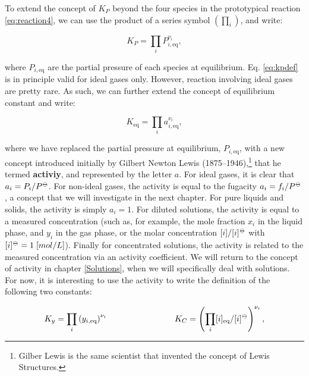 \documentclass[
  9pt,
]{extbook}
\theoremstyle{definition}
\theoremstyle{definition}
\theoremstyle{definition}
\theoremstyle{remark}
\begin{document}
To extend the concept of \(K_P\) beyond the four species in the prototypical reaction \eqref{eq:reaction4}, we can use the product of a series symbol \(\left( \prod_i \right)\), and write:

\begin{equation}
K_P=\prod_i P_{i,\text{eq}}^{\nu_i},
\label{eq:kpdef}
\end{equation}

where \(P_{i,\text{eq}}\) are the partial pressure of each species at equilibrium. Eq. \eqref{eq:kpdef} is in principle valid for ideal gases only. However, reaction involving ideal gases are pretty rare. As such, we can further extend the concept of equilibrium constant and write:

\begin{equation}
K_{\text{eq}} =\prod_i a_{i,\text{eq}}^{\nu_i},
\label{eq:kdef}
\end{equation}

where we have replaced the partial pressure at equilibrium, \(P_{i,\text{eq}}\), with a new concept introduced initially by Gilbert Newton Lewis (1875--1946),\footnote{Gilber Lewis is the same scientist that invented the concept of Lewis Structures.} that he termed \textbf{activiy}, and represented by the letter \(a\). For ideal gases, it is clear that \(a_i=P_i/P^{-\kern-6pt{\ominus}\kern-6pt-}\). For non-ideal gases, the activity is equal to the fugacity \(a_i=f_i/P^{-\kern-6pt{\ominus}\kern-6pt-}\), a concept that we will investigate in the next chapter. For pure liquids and solids, the activity is simply \(a_i=1\). For diluted solutions, the activity is equal to a measured concentration (such as, for example, the mole fraction \(x_i\) in the liquid phase, and \(y_i\) in the gas phase, or the molar concentration \([i]/[i]^{-\kern-6pt{\ominus}\kern-6pt-}\) with \([i]^{-\kern-6pt{\ominus}\kern-6pt-}= 1\;\text[mol/L]\)). Finally for concentrated solutions, the activity is related to the measured concentration via an activity coefficient. We will return to the concept of activity in chapter \ref{Solutions}, when we will specifically deal with solutions. For now, it is interesting to use the activity to write the definition of the following two constants:

\begin{equation}
K_y =\prod_i \left( y_{i,\text{eq}} \right)^{\nu_i} \qquad \qquad \qquad \qquad K_C =\left( \prod_i [i]_{\text{eq}}/[i]^{-\kern-6pt{\ominus}\kern-6pt-}\right)^{\nu_i},
\label{eq:kxkcdef}
\end{equation}
\end{document}

